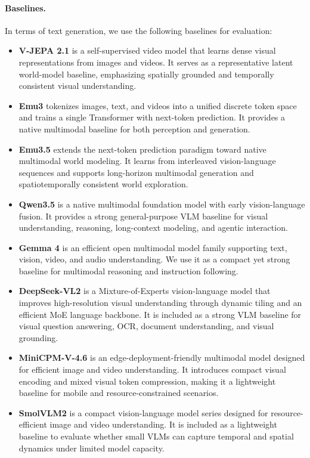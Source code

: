 \documentclass{llmxive}
\begin{document}
\paragraph{Baselines.} In terms of text generation, we use the following baselines for evaluation:

\begin{itemize}
    \item \textbf{V-JEPA 2.1} \citep{V-JEPA-2.1} is a self-supervised video model that learns dense visual representations from images and videos. It serves as a representative latent world-model baseline, emphasizing spatially grounded and temporally consistent visual understanding.
    \item \textbf{Emu3} \citep{Emu3} tokenizes images, text, and videos into a unified discrete token space and trains a single Transformer with next-token prediction. It provides a native multimodal baseline for both perception and generation.
    \item \textbf{Emu3.5} \citep{Emu35} extends the next-token prediction paradigm toward native multimodal world modeling. It learns from interleaved vision-language sequences and supports long-horizon multimodal generation and spatiotemporally consistent world exploration.
    \item \textbf{Qwen3.5} \citep{qwen35} is a native multimodal foundation model with early vision-language fusion. It provides a strong general-purpose VLM baseline for visual understanding, reasoning, long-context modeling, and agentic interaction.
    \item \textbf{Gemma 4} \citep{Gemma4} is an efficient open multimodal model family supporting text, vision, video, and audio understanding. We use it as a compact yet strong baseline for multimodal reasoning and instruction following.
    \item \textbf{DeepSeek-VL2} \citep{DeepSeek-VL2} is a Mixture-of-Experts vision-language model that improves high-resolution visual understanding through dynamic tiling and an efficient MoE language backbone. It is included as a strong VLM baseline for visual question answering, OCR, document understanding, and visual grounding.
    \item \textbf{MiniCPM-V-4.6} \citep{MiniCPM-o-4.5} is an edge-deployment-friendly multimodal model designed for efficient image and video understanding. It introduces compact visual encoding and mixed visual token compression, making it a lightweight baseline for mobile and resource-constrained scenarios.
    \item \textbf{SmolVLM2} \citep{SmolVLM} is a compact vision-language model series designed for resource-efficient image and video understanding. It is included as a lightweight baseline to evaluate whether small VLMs can capture temporal and spatial dynamics under limited model capacity.
\end{itemize}
\end{document}
